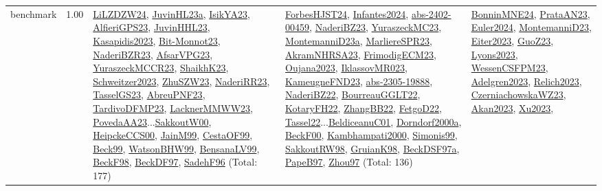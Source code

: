 {\begin{longtable}{p{3cm}r>{\raggedright\arraybackslash}p{6cm}>{\raggedright\arraybackslash}p{6cm}>{\raggedright\arraybackslash}p{8cm}}
\index{benchmark}\index{Benchmarks!benchmark}benchmark &  1.00 & \hyperref[detail:LiLZDZW24]{LiLZDZW24}, \hyperref[detail:JuvinHL23a]{JuvinHL23a}, \hyperref[detail:IsikYA23]{IsikYA23}, \hyperref[detail:AlfieriGPS23]{AlfieriGPS23}, \hyperref[detail:JuvinHHL23]{JuvinHHL23}, \hyperref[detail:Kasapidis2023]{Kasapidis2023}, \hyperref[detail:Bit-Monnot23]{Bit-Monnot23}, \hyperref[detail:NaderiBZR23]{NaderiBZR23}, \hyperref[detail:AfsarVPG23]{AfsarVPG23}, \hyperref[detail:YuraszeckMCCR23]{YuraszeckMCCR23}, \hyperref[detail:ShaikhK23]{ShaikhK23}, \hyperref[detail:Schweitzer2023]{Schweitzer2023}, \hyperref[detail:ZhuSZW23]{ZhuSZW23}, \hyperref[detail:NaderiRR23]{NaderiRR23}, \hyperref[detail:TasselGS23]{TasselGS23}, \hyperref[detail:AbreuPNF23]{AbreuPNF23}, \hyperref[detail:TardivoDFMP23]{TardivoDFMP23}, \hyperref[detail:LacknerMMWW23]{LacknerMMWW23}, \hyperref[detail:PovedaAA23]{PovedaAA23}...\hyperref[detail:SakkoutW00]{SakkoutW00}, \hyperref[detail:HeipckeCCS00]{HeipckeCCS00}, \hyperref[detail:JainM99]{JainM99}, \hyperref[detail:CestaOF99]{CestaOF99}, \hyperref[detail:Beck99]{Beck99}, \hyperref[detail:WatsonBHW99]{WatsonBHW99}, \hyperref[detail:BensanaLV99]{BensanaLV99}, \hyperref[detail:BeckF98]{BeckF98}, \hyperref[detail:BeckDF97]{BeckDF97}, \hyperref[detail:SadehF96]{SadehF96} (Total: 177) & \hyperref[detail:ForbesHJST24]{ForbesHJST24}, \hyperref[detail:Infantes2024]{Infantes2024}, \hyperref[detail:abs-2402-00459]{abs-2402-00459}, \hyperref[detail:NaderiBZ23]{NaderiBZ23}, \hyperref[detail:YuraszeckMC23]{YuraszeckMC23}, \hyperref[detail:MontemanniD23a]{MontemanniD23a}, \hyperref[detail:MarliereSPR23]{MarliereSPR23}, \hyperref[detail:AkramNHRSA23]{AkramNHRSA23}, \hyperref[detail:FrimodigECM23]{FrimodigECM23}, \hyperref[detail:Oujana2023]{Oujana2023}, \hyperref[detail:IklassovMR023]{IklassovMR023}, \hyperref[detail:KameugneFND23]{KameugneFND23}, \hyperref[detail:abs-2305-19888]{abs-2305-19888}, \hyperref[detail:NaderiBZ22]{NaderiBZ22}, \hyperref[detail:BourreauGGLT22]{BourreauGGLT22}, \hyperref[detail:KotaryFH22]{KotaryFH22}, \hyperref[detail:ZhangBB22]{ZhangBB22}, \hyperref[detail:FetgoD22]{FetgoD22}, \hyperref[detail:Tassel22]{Tassel22}...\hyperref[detail:BeldiceanuC01]{BeldiceanuC01}, \hyperref[detail:Dorndorf2000a]{Dorndorf2000a}, \hyperref[detail:BeckF00]{BeckF00}, \hyperref[detail:Kambhampati2000]{Kambhampati2000}, \hyperref[detail:Simonis99]{Simonis99}, \hyperref[detail:SakkoutRW98]{SakkoutRW98}, \hyperref[detail:GruianK98]{GruianK98}, \hyperref[detail:BeckDSF97a]{BeckDSF97a}, \hyperref[detail:PapeB97]{PapeB97}, \hyperref[detail:Zhou97]{Zhou97} (Total: 136) & \hyperref[detail:BonninMNE24]{BonninMNE24}, \hyperref[detail:PrataAN23]{PrataAN23}, \hyperref[detail:Euler2024]{Euler2024}, \hyperref[detail:MontemanniD23]{MontemanniD23}, \hyperref[detail:Eiter2023]{Eiter2023}, \hyperref[detail:GuoZ23]{GuoZ23}, \hyperref[detail:Lyons2023]{Lyons2023}, \hyperref[detail:WessenCSFPM23]{WessenCSFPM23}, \hyperref[detail:Adelgren2023]{Adelgren2023}, \hyperref[detail:Relich2023]{Relich2023}, \hyperref[detail:CzerniachowskaWZ23]{CzerniachowskaWZ23}, \hyperref[detail:Akan2023]{Akan2023}, \hyperref[detail:Xu2023]{Xu2023}, 
\end{longtable}}

